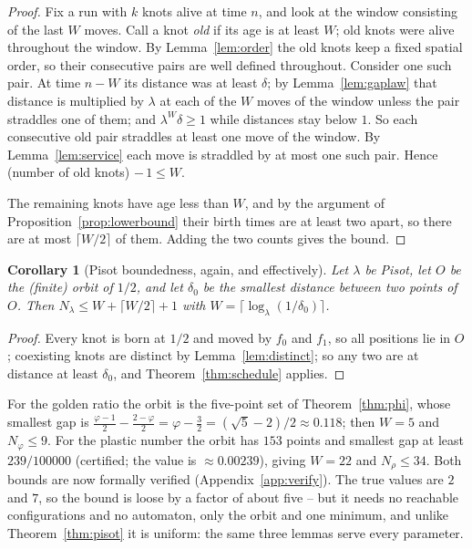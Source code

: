 \documentclass[11pt,reqno]{amsart}
\theoremstyle{plain}
\newtheorem{corollary}[theorem]{Corollary}
\theoremstyle{definition}
\theoremstyle{remark}
\begin{document}
\begin{proof}
Fix a run with $k$ knots alive at time $n$, and look at the window consisting
of the last $W$ moves. Call a knot \emph{old} if its age is at least $W$; old
knots were alive throughout the window. By Lemma~\ref{lem:order} the old
knots keep a fixed spatial order, so their consecutive pairs are well defined
throughout. Consider one such pair. At time $n-W$ its distance was at least
$\delta$; by Lemma~\ref{lem:gaplaw} that distance is multiplied by $\lambda$
at each of the $W$ moves of the window unless the pair straddles one of them;
and $\lambda^W\delta\geq1$ while distances stay below $1$. So each
consecutive old pair straddles at least one move of the window. By
Lemma~\ref{lem:service} each move is straddled by at most one such pair.
Hence (number of old knots) $-\,1\leq W$.

The remaining knots have age less than $W$, and by the argument of
Proposition~\ref{prop:lowerbound} their birth times are at least two apart, so
there are at most $\lceil W/2\rceil$ of them. Adding the two counts gives the
bound.
\end{proof}

\begin{corollary}[Pisot boundedness, again, and effectively]\label{cor:effective}
Let $\lambda$ be Pisot, let $O$ be the (finite) orbit of $1/2$, and let
$\delta_0$ be the smallest distance between two points of $O$. Then
$N_\lambda\leq W+\lceil W/2\rceil+1$ with
$W=\lceil\log_\lambda(1/\delta_0)\rceil$.
\end{corollary}

\begin{proof}
Every knot is born at $1/2$ and moved by $f_0$ and $f_1$, so all positions lie
in $O$; coexisting knots are distinct by Lemma~\ref{lem:distinct}; so any two
are at distance at least $\delta_0$, and Theorem~\ref{thm:schedule} applies.
\end{proof}

For the golden ratio the orbit is the five-point set of
Theorem~\ref{thm:phi}, whose smallest gap is
$\frac{\varphi-1}{2}-\frac{2-\varphi}{2}=\varphi-\tfrac32=(\sqrt5-2)/2\approx
0.118$; then $W=5$ and $N_\varphi\leq9$. For the plastic number the orbit has
$153$ points and smallest gap at least $239/100000$ (certified; the value is
$\approx0.00239$), giving $W=22$ and $N_\rho\leq34$. Both bounds are now
formally verified (Appendix~\ref{app:verify}). The true values are $2$ and $7$,
so the bound is loose by a factor of about five -- but it needs no reachable
configurations and no automaton, only the orbit and one minimum, and unlike
Theorem~\ref{thm:pisot} it is uniform: the same three lemmas serve every
parameter.
\end{document}

